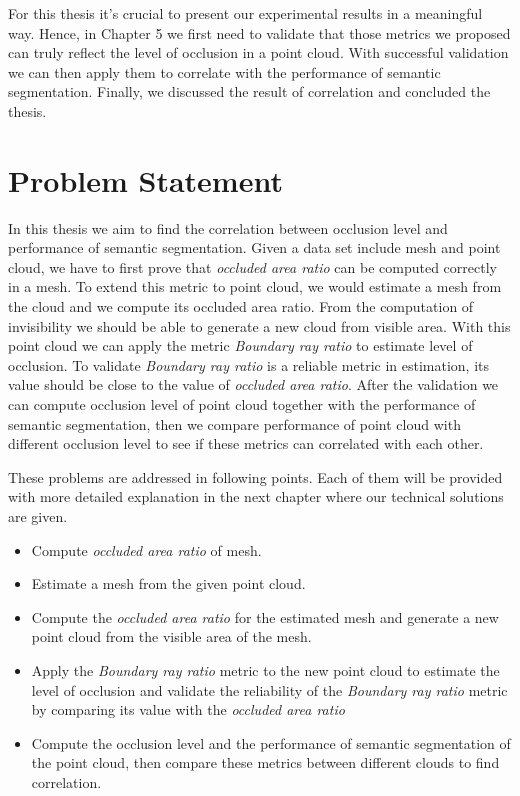 \documentclass[11pt, a4paper,oneside,chapterprefix=false]{scrbook}
\begin{document}
\vspace{10pt}

For this thesis it's crucial to present our experimental results in a meaningful way. Hence, in Chapter 5 we first need to validate that those metrics we proposed can truly reflect the level of occlusion in a point cloud. With successful validation we can then apply them to correlate with the performance of semantic segmentation. Finally, we discussed the result of correlation and concluded the thesis.


\chapter{Problem Statement} \label{chp:problem}

In this thesis we aim to find the correlation between occlusion level and performance of semantic segmentation. Given a data set include mesh and point cloud, we have to first prove that \emph{occluded area ratio} can be computed correctly in a mesh. To extend this metric to point cloud, we would estimate a mesh from the cloud and we compute its occluded area ratio. From the computation of invisibility we should be able to generate a new cloud from visible area. With this point cloud we can apply the metric \emph{Boundary ray ratio} to estimate level of occlusion. To validate \emph{Boundary ray ratio} is a reliable metric in estimation, its value should be close to the value of \emph{occluded area ratio}. After the validation we can compute occlusion level of point cloud together with the performance of semantic segmentation, then we compare performance of point cloud with different occlusion level to see if these metrics can correlated with each other.

\vspace{10pt}

These problems are addressed in following points. Each of them will be provided with more detailed explanation in the next chapter where our technical solutions are given.

\begin{itemize}
    \item Compute \emph{occluded area ratio} of mesh.
    \item Estimate a mesh from the given point cloud.
    \item Compute the \emph{occluded area ratio} for the estimated mesh and generate a new point cloud from the visible area of the mesh.
    \item Apply the \emph{Boundary ray ratio} metric to the new point cloud to estimate the level of occlusion and validate the reliability of the \emph{Boundary ray ratio} metric by comparing its value with the \emph{occluded area ratio}
    \item Compute the occlusion level and the performance of semantic segmentation of the point cloud, then compare these metrics between different clouds to find correlation. 
\end{itemize}
\end{document}
